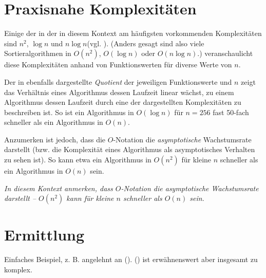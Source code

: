 \section{Praxisnahe Komplexitäten}

Einige der in der in diesem Kontext am häufigsten vorkommenden Komplexitäten sind $n^2$, $\log n$ und $n \log n$\footnotemark (vgl. \cite[38]{hsr1997}). (Anders gesagt sind also viele Sortieralgorithmen in $O(n^2)$, $O(\log n)$ oder $O(n \log n)$.)  veranschaulicht diese Komplexitäten anhand von Funktionswerten für diverse Werte von $n$.


Der in  ebenfalls dargestellte \emph{Quotient} der jeweiligen Funktionswerte und $n$ zeigt das Verhältnis eines Algorithmus dessen Laufzeit linear wächst, zu einem Algorithmus dessen Laufzeit durch eine der dargestellten Komplexitäten zu beschreiben ist. So ist ein Algorithmus in $O(\log n)$ für $n = 256$ fast 50-fach schneller als ein Algorithmus in $O(n)$.

Anzumerken ist jedoch, dass die $O$-Notation die \emph{asymptotische} Wachstumsrate darstellt (bzw. die Komplexität eines Algorithmus als asymptotisches Verhalten zu sehen ist). So kann etwa ein Algorithmus in $O(n^2)$ für kleine $n$ schneller als ein Algorithmus in $O(n)$ sein.

\emph{In diesem Kontext anmerken, dass $O$-Notation die \emph{asymptotische Wachstumsrate} darstellt -- $O(n^2)$ kann für kleine $n$ schneller als $O(n)$ sein.}





\section{Ermittlung}

Einfaches Beispiel, z. B. angelehnt an \cite[69]{sha2011} (). \cite{ahu1974} () ist erwähnenswert aber insgesamt zu komplex.
